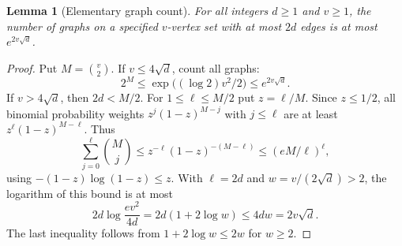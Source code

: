 \documentclass[11pt]{article}
\newcommand{\1}{\mathbf 1}
\newtheorem{lemma}[theorem]{Lemma}
\theoremstyle{definition}
\theoremstyle{remark}
\numberwithin{equation}{section}
\begin{document}
\begin{lemma}[Elementary graph count]\label{lem:count}
For all integers $d\ge1$ and $v\ge1$, the number of graphs on a specified $v$-vertex set with at most $2d$ edges is at most $e^{2v\sqrt d}$.
\end{lemma}
\begin{proof}
Put $M=\binom v2$. If $v\le4\sqrt d$, count all graphs:
\[
 2^M\le\exp\bigl((\log2)v^2/2\bigr)\le e^{2v\sqrt d}.
\]
If $v>4\sqrt d$, then $2d<M/2$. For $1\le\ell\le M/2$ put $z=\ell/M$. Since $z\le1/2$, all binomial probability weights $z^j(1-z)^{M-j}$ with $j\le\ell$ are at least $z^\ell(1-z)^{M-\ell}$. Thus
\[
 \sum_{j=0}^{\ell}\binom Mj
 \le z^{-\ell}(1-z)^{-(M-\ell)}
 \le(eM/\ell)^\ell,
\]
using $-(1-z)\log(1-z)\le z$. With $\ell=2d$ and $w=v/(2\sqrt d)>2$, the logarithm of this bound is at most
\[
 2d\log\frac{ev^2}{4d}=2d(1+2\log w)\le4dw=2v\sqrt d.
\]
The last inequality follows from $1+2\log w\le2w$ for $w\ge2$.
\end{proof}
\end{document}
